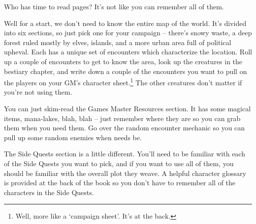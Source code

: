 \begin{multicols}{2}

Who has time to read \pageref{lastpage} pages?  It's not like you can remember all of them.

Well for a start, we don't need to know the entire map of the world.
It's divided into six sections, so just pick one for your campaign -- there's snowy waste, a deep forest ruled mostly by elves, islands, and a more urban area full of political upheval.
Each has a unique set of encounters which characterize the location.
Roll up a couple of encounters to get to know the area, look up the creatures in the bestiary chapter, and write down a couple of the encounters you want to pull on the players on your GM's character sheet.\footnote{Well, more like a `campaign sheet'.  It's at the back.}
The other creatures don't matter if you're not using them.

You can just skim-read the Games Master Resources section.
It has some magical items, mana-lakes, blah, blah -- just remember where they are so you can grab them when you need them.
Go over the random encounter mechanic so you can pull up some random enemies when needs be.

The Side Quests section is a little different.
You'll need to be familiar with each of the Side Quests you want to pick, and if you want to use all of them, you should be familiar with the overall plot they weave.
A helpful character glossary is provided at the back of the book so you don't have to remember all of the characters in the Side Quests.

\end{multicols}

